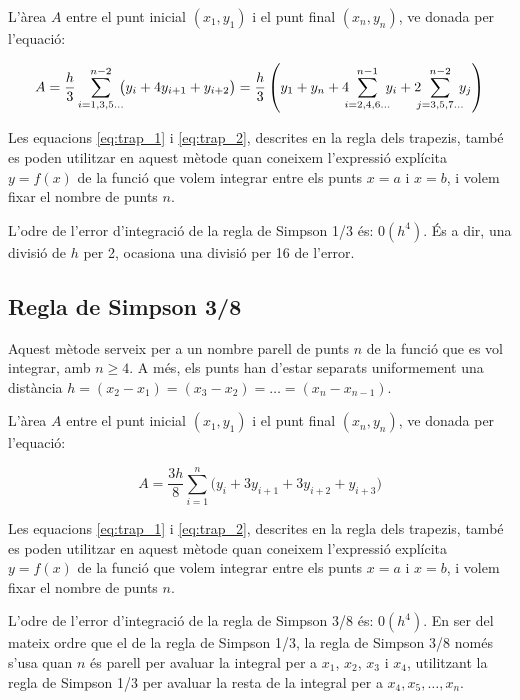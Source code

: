 L'àrea $A$ entre el punt inicial $(x_1, y_1)$ i el punt final $(x_n, y_n)$, ve donada per l'equació:

 \begin{equation}\label{eq:simp_1_3}
   A =  \frac{h}{3} \sum_{i=1,3,5\dots}^{n-2} \hspace{-0.5em} \big( y_i + 4 y_{i+1} + y_{i+2} \big) =
   \frac{h}{3} \left( y_1 + y_n + 4 \hspace{-0.5em} \sum_{i=2,4,6\dots}^{n-1} \hspace{-0.5em} y_i +
   2 \hspace{-0.5em} \sum_{j=3,5,7\dots}^{n-2} \hspace{-0.5em} y_j \right)
 \end{equation}

Les equacions \eqref{eq:trap_1} i \eqref{eq:trap_2}, descrites en la regla dels trapezis, també es poden utilitzar en aquest mètode quan  coneixem l'expressió explícita $y=f(x)$ de la funció que volem integrar entre els punts $x=a$ i $x=b$, i volem fixar el nombre de punts $n$.

L'odre de l'error d'integració de la regla de Simpson 1/3 és: $0(h^4)$. És a dir, una divisió de $h$ per 2, ocasiona una divisió per 16 de l'error.

 \subsection{Regla de Simpson 3/8}

Aquest mètode serveix per a un nombre parell de punts $n$ de la funció que es vol integrar, amb $n \geq 4$. A més, els punts han d'estar separats uniformement una distància $h = (x_2-x_1) = (x_3-x_2) = \dots = (x_n-x_{n-1})$.

L'àrea $A$ entre el punt inicial $(x_1, y_1)$ i el punt final $(x_n, y_n)$, ve donada per l'equació:

 \begin{equation}\label{eq:simp_3_8}
   A =  \frac{3h}{8} \sum_{i=1}^{n} \big( y_i + 3 y_{i+1} + 3 y_{i+2} + y_{i+3}\big)
 \end{equation}

 Les equacions \eqref{eq:trap_1} i \eqref{eq:trap_2}, descrites en la regla dels trapezis, també es poden utilitzar en aquest mètode quan  coneixem l'expressió explícita $y=f(x)$ de la funció que volem integrar entre els punts $x=a$ i $x=b$, i volem fixar el nombre de punts $n$.

 L'odre de l'error d'integració de la regla de Simpson 3/8 és: $0(h^4)$. En ser del mateix ordre que el de la regla de Simpson 1/3, la regla de Simpson 3/8 només s'usa quan $n$ és parell per avaluar la integral per a $x_1$, $x_2$, $x_3$ i $x_4$, utilitzant la regla de Simpson 1/3 per avaluar la resta de la integral per a  $x_4, x_5, \dotsc , x_n$.

